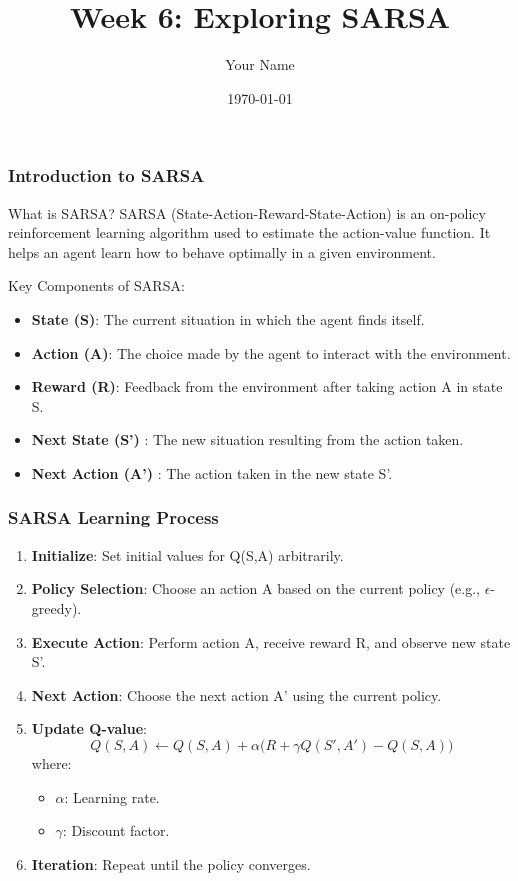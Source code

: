 \documentclass{beamer}
\title{Week 6: Exploring SARSA}
\author{Your Name}
\institute{Your Institution}
\date{\today}
\begin{document}
\frame{\titlepage}

\begin{frame}[fragile]
    \frametitle{Introduction to SARSA}
    \begin{block}{What is SARSA?}
        SARSA (State-Action-Reward-State-Action) is an on-policy reinforcement learning algorithm used to estimate the action-value function. It helps an agent learn how to behave optimally in a given environment.
    \end{block}
    
    \begin{block}{Key Components of SARSA:}
        \begin{itemize}
            \item \textbf{State (S)}: The current situation in which the agent finds itself.
            \item \textbf{Action (A)}: The choice made by the agent to interact with the environment.
            \item \textbf{Reward (R)}: Feedback from the environment after taking action A in state S.
            \item \textbf{Next State (S')} : The new situation resulting from the action taken.
            \item \textbf{Next Action (A')} : The action taken in the new state S'.
        \end{itemize}
    \end{block}
\end{frame}

\begin{frame}[fragile]
    \frametitle{SARSA Learning Process}
    \begin{enumerate}
        \item \textbf{Initialize}: Set initial values for Q(S,A) arbitrarily.
        \item \textbf{Policy Selection}: Choose an action A based on the current policy (e.g., $\epsilon$-greedy).
        \item \textbf{Execute Action}: Perform action A, receive reward R, and observe new state S'.
        \item \textbf{Next Action}: Choose the next action A' using the current policy.
        \item \textbf{Update Q-value}:
        \begin{equation}
        Q(S, A) \leftarrow Q(S, A) + \alpha \big( R + \gamma Q(S', A') - Q(S, A) \big)
        \end{equation}
        where:
        \begin{itemize}
            \item $\alpha$: Learning rate.
            \item $\gamma$: Discount factor.
        \end{itemize}
        \item \textbf{Iteration}: Repeat until the policy converges.
    \end{enumerate} 
\end{frame}
\end{document}

